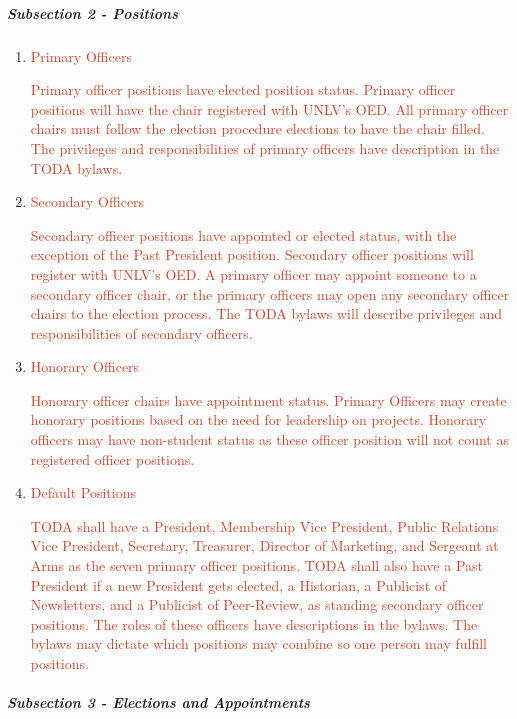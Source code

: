 \documentclass[12pt]{report}
\begin{document}
\subparagraph{Subsection 2 - Positions}
\begin{enumerate}[label*={\fontsize{12pt}{12pt}\selectfont \arabic*.}]
	\item \textcolor[HTML]{CC4125}{Primary Officers}\par

\textcolor[HTML]{CC4125}{Primary officer positions have elected position status. Primary officer positions will have the chair registered with UNLV’s OED. All primary officer chairs must follow the election procedure elections to have the chair filled. The privileges and responsibilities of primary officers have description in the TODA bylaws.}\par

	\item \textcolor[HTML]{CC4125}{Secondary Officers}\par

\textcolor[HTML]{CC4125}{Secondary officer positions have appointed or elected status, with the exception of the Past President position. Secondary officer positions will register with UNLV’s OED. A primary officer may appoint someone to a secondary officer chair, or the primary officers may open any secondary officer chairs to the election process. The TODA bylaws will describe privileges and responsibilities of secondary officers.}\par

	\item \textcolor[HTML]{CC4125}{Honorary Officers}\par

\textcolor[HTML]{CC4125}{Honorary officer chairs have appointment status. Primary Officers may create honorary positions based on the need for leadership on projects. Honorary officers may have non-student status as these officer position will not count as registered officer positions.}\par

	\item \textcolor[HTML]{CC4125}{Default Positions}\par

\textcolor[HTML]{CC4125}{TODA shall have a President, Membership Vice President, Public Relations Vice President, Secretary, Treasurer, Director of Marketing, and Sergeant at Arms as the seven primary officer positions. TODA shall also have a Past President if a new President gets elected, a Historian, a Publicist of Newsletters, and a Publicist of Peer-Review, as standing secondary officer positions. The roles of these officers have descriptions in the bylaws. The bylaws may dictate which positions may combine so one person may fulfill  positions.}\par


\vspace{\baselineskip}

\vspace{\baselineskip}

\vspace{\baselineskip}

\vspace{\baselineskip}

\end{enumerate}\subparagraph{Subsection 3 - Elections and Appointments}
\end{document}
